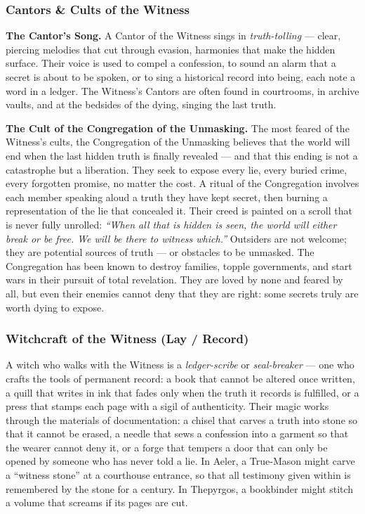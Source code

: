 \subsubsection*{Cantors \& Cults of the Witness}

\textbf{The Cantor's Song.} A Cantor of the Witness sings in \textit{truth-tolling} --- clear, piercing melodies that cut through evasion, harmonies that make the hidden surface. Their voice is used to compel a confession, to sound an alarm that a secret is about to be spoken, or to sing a historical record into being, each note a word in a ledger. The Witness's Cantors are often found in courtrooms, in archive vaults, and at the bedsides of the dying, singing the last truth.

\textbf{The Cult of the Congregation of the Unmasking.} The most feared of the Witness's cults, the Congregation of the Unmasking believes that the world will end when the last hidden truth is finally revealed --- and that this ending is not a catastrophe but a liberation. They seek to expose every lie, every buried crime, every forgotten promise, no matter the cost. A ritual of the Congregation involves each member speaking aloud a truth they have kept secret, then burning a representation of the lie that concealed it. Their creed is painted on a scroll that is never fully unrolled: \textit{``When all that is hidden is seen, the world will either break or be free. We will be there to witness which.''} Outsiders are not welcome; they are potential sources of truth --- or obstacles to be unmasked. The Congregation has been known to destroy families, topple governments, and start wars in their pursuit of total revelation. They are loved by none and feared by all, but even their enemies cannot deny that they are right: some secrets truly are worth dying to expose.

\subsubsection*{Witchcraft of the Witness (Lay / Record)}

A witch who walks with the Witness is a \textit{ledger-scribe} or \textit{seal-breaker} --- one who crafts the tools of permanent record: a book that cannot be altered once written, a quill that writes in ink that fades only when the truth it records is fulfilled, or a press that stamps each page with a sigil of authenticity. Their magic works through the materials of documentation: a chisel that carves a truth into stone so that it cannot be erased, a needle that sews a confession into a garment so that the wearer cannot deny it, or a forge that tempers a door that can only be opened by someone who has never told a lie. In Aeler, a True-Mason might carve a ``witness stone'' at a courthouse entrance, so that all testimony given within is remembered by the stone for a century. In Thepyrgos, a bookbinder might stitch a volume that screams if its pages are cut.

